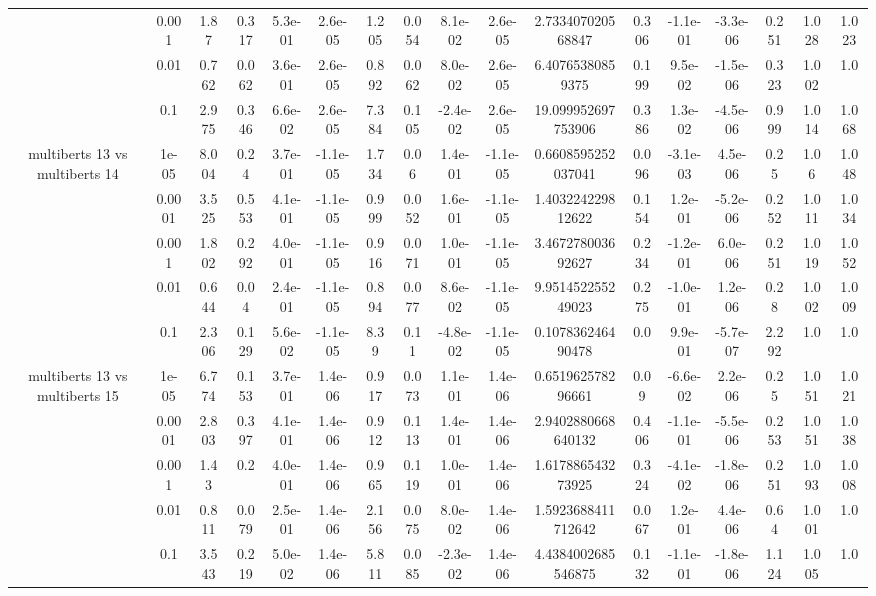 \begin{tabular}{|c|c|c|c|c|c|c|c|c|c|c|c|c|c|c|c|c|}
 & 0.001 & 1.87 & 0.317 & 5.3e-01 & 2.6e-05 & 1.205 & 0.054 & 8.1e-02 & 2.6e-05 & 2.733407020568847 & 0.306 & -1.1e-01 & -3.3e-06 & 0.251 & 1.028 & 1.023 \\
 & 0.01 & 0.762 & 0.062 & 3.6e-01 & 2.6e-05 & 0.892 & 0.062 & 8.0e-02 & 2.6e-05 & 6.40765380859375 & 0.199 & 9.5e-02 & -1.5e-06 & 0.323 & 1.002 & 1.0 \\
 & 0.1 & 2.975 & 0.346 & 6.6e-02 & 2.6e-05 & 7.384 & 0.105 & -2.4e-02 & 2.6e-05 & 19.099952697753906 & 0.386 & 1.3e-02 & -4.5e-06 & 0.999 & 1.014 & 1.068 \\
\hline
\multirow{5}{*}{multiberts 13 vs multiberts 14} & 1e-05 & 8.004 & 0.24 & 3.7e-01 & -1.1e-05 & 1.734 & 0.06 & 1.4e-01 & -1.1e-05 & 0.6608595252037041 & 0.096 & -3.1e-03 & 4.5e-06 & 0.25 & 1.06 & 1.048 \\
 & 0.0001 & 3.525 & 0.553 & 4.1e-01 & -1.1e-05 & 0.999 & 0.052 & 1.6e-01 & -1.1e-05 & 1.403224229812622 & 0.154 & 1.2e-01 & -5.2e-06 & 0.252 & 1.011 & 1.034 \\
 & 0.001 & 1.802 & 0.292 & 4.0e-01 & -1.1e-05 & 0.916 & 0.071 & 1.0e-01 & -1.1e-05 & 3.467278003692627 & 0.234 & -1.2e-01 & 6.0e-06 & 0.251 & 1.019 & 1.052 \\
 & 0.01 & 0.644 & 0.04 & 2.4e-01 & -1.1e-05 & 0.894 & 0.077 & 8.6e-02 & -1.1e-05 & 9.951452255249023 & 0.275 & -1.0e-01 & 1.2e-06 & 0.28 & 1.002 & 1.009 \\
 & 0.1 & 2.306 & 0.129 & 5.6e-02 & -1.1e-05 & 8.39 & 0.11 & -4.8e-02 & -1.1e-05 & 0.107836246490478 & 0.0 & 9.9e-01 & -5.7e-07 & 2.292 & 1.0 & 1.0 \\
\hline
\multirow{5}{*}{multiberts 13 vs multiberts 15} & 1e-05 & 6.774 & 0.153 & 3.7e-01 & 1.4e-06 & 0.917 & 0.073 & 1.1e-01 & 1.4e-06 & 0.651962578296661 & 0.09 & -6.6e-02 & 2.2e-06 & 0.25 & 1.051 & 1.021 \\
 & 0.0001 & 2.803 & 0.397 & 4.1e-01 & 1.4e-06 & 0.912 & 0.113 & 1.4e-01 & 1.4e-06 & 2.9402880668640132 & 0.406 & -1.1e-01 & -5.5e-06 & 0.253 & 1.051 & 1.038 \\
 & 0.001 & 1.43 & 0.2 & 4.0e-01 & 1.4e-06 & 0.965 & 0.119 & 1.0e-01 & 1.4e-06 & 1.617886543273925 & 0.324 & -4.1e-02 & -1.8e-06 & 0.251 & 1.093 & 1.008 \\
 & 0.01 & 0.811 & 0.079 & 2.5e-01 & 1.4e-06 & 2.156 & 0.075 & 8.0e-02 & 1.4e-06 & 1.5923688411712642 & 0.067 & 1.2e-01 & 4.4e-06 & 0.64 & 1.001 & 1.0 \\
 & 0.1 & 3.543 & 0.219 & 5.0e-02 & 1.4e-06 & 5.811 & 0.085 & -2.3e-02 & 1.4e-06 & 4.4384002685546875 & 0.132 & -1.1e-01 & -1.8e-06 & 1.124 & 1.005 & 1.0 \\

\end{tabular}
